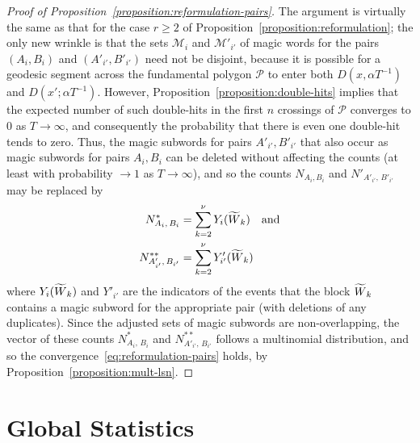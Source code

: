 \documentclass[AHL, Unicode, longabstracts, published]{cedram}
\let\oldtilde\tilde
\renewcommand*{\tilde}[1]{\mathchoice{\widetilde{#1}}{\widetilde{#1}}{\oldtilde{#1}}{\oldtilde{#1}}}\let\oldforall\forall
\renewcommand*{\forall}{\mathrel{\oldforall}}
\begin{document}
\begin{proof}
[Proof of Proposition~\ref{proposition:reformulation-pairs}]
The argument is virtually the same as that for the case $r\geq 2$ of Proposition~\ref{proposition:reformulation}; the only new wrinkle is that the sets $\mathcal{M}_{i}$ and $\mathcal{M}'_{i'}$ of magic words for the pairs $(A_{i},B_{i})$ and $(A'_{i'},B'_{i'})$ need not be disjoint, because it is possible for a geodesic segment across the fundamental polygon $\mathcal{P}$ to enter both $D (x,\alpha T^{-1})$ and $D (x';\alpha T^{-1})$. However, Proposition~\ref{proposition:double-hits} implies that the expected number of such double-hits in the first $n$ crossings of $\mathcal{P}$ converges to $0$ as $T \rightarrow \infty$, and consequently the probability that there is even one double-hit tends to zero. Thus, the magic subwords for pairs $A'_{i'},B'_{i'}$ that also occur as magic subwords for pairs $A_{i},B_{i}$ can be deleted without affecting the counts (at least with probability $\rightarrow 1$ as $T \rightarrow \infty$), and so the counts $N_{A_{i},B_{i}}$ and $N'_{A'_{i'},\,B'_{i'}}$ may be replaced by
\begin{align*}
N^{*}_{A_{i},\,B_{i}}&=\sum_{k=2}^{\nu} Y_{i} (\tilde{W}_{k}) \quad \text{and}\\
N^{**}_{A'_{i'},\,B_{i'}}&=\sum_{k=2}^{\nu} Y'_{i'} (\tilde{W}_{k})
\end{align*}
where $Y_{i}(\tilde{W}_{k})$ and $Y'_{i'}$ are the indicators of the events that the block $\tilde{W}_{k}$ contains a magic subword for the appropriate pair (with deletions of any duplicates). Since the adjusted sets of magic subwords are non-overlapping, the vector of these counts $N^{*}_{A_{i},\,B_{i}}$ and $N^{**}_{A'_{i'},\,B_{i'}}$ follows a multinomial distribution, and so the convergence~\eqref{eq:reformulation-pairs} holds, by Proposition~\ref{proposition:mult-lsn}.
\end{proof}

\section{Global Statistics}\label{sec:global-stats}
\end{document}
